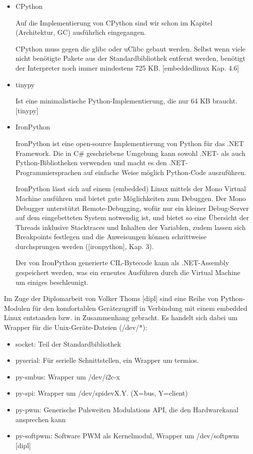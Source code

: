 \begin{itemize}

  \item CPython

        Auf die Implementierung von CPython sind wir schon im Kapitel
        (Architektur, GC) ausführlich eingegangen.

        CPython muss gegen die glibc oder uClibc gebaut werden. Selbst wenn
        viele nicht benötigte Pakete aus der Standardbibliothek entfernt
        werden, benötigt der Interpreter noch immer mindestens 725 KB.
        [embeddedlinux Kap. 4.6]

  \item tinypy

        Ist eine minimalistische Python-Implementierung, die nur 64 KB braucht. [tinypy]
  \item IronPython

        IronPython ist eine open-source Implementierung von Python für das
        .NET Framework. Die in C\# geschriebene Umgebung kann sowohl .NET-
        als auch Python-Bibliotheken verwenden und macht es den
        .NET-Programmiersprachen auf einfache Weise möglich Python-Code
        auszuführen.

        IronPython lässt sich auf einem (embedded) Linux mittels der Mono
        Virtual Machine ausführen und bietet gute Möglichkeiten zum Debuggen.
        Der Mono Debugger unterstützt Remote-Debugging, wofür nur ein kleiner
        Debug-Server auf dem eingebetteten System notwendig ist, und bietet so
        eine Übersicht der Threads inklusive Stacktraces und Inhalten der
        Variablen, zudem lassen sich Breakpoints festlegen und die Anweisungen
        können schrittweise durchsprungen werden ([ironpython], Kap. 3).

        Der von IronPython generierte CIL-Bytecode kann als .NET-Assembly
        gespeichert werden, was ein erneutes Ausführen durch die Virtual
        Machine um einiges beschleunigt.

\end{itemize}


Im Zuge der Diplomarbeit von Volker Thoms [dipl] sind eine Reihe von
Python-Modulen für den komfortablen Gerätezugriff in Verbindung mit einem
embedded Linux entstanden bzw. in Zusammenhang gebracht. Es handelt sich dabei
um Wrapper für die Unix-Geräte-Dateien (/dev/*):


\begin{itemize}

  \item socket: Teil der Standardbibliothek
  \item pyserial: Für serielle Schnittstellen, ein Wrapper um termios.
  \item py-smbus: Wrapper um /dev/i2c-x
  \item py-spi: Wrapper um /dev/spidevX.Y. (X=bus, Y=client)
  \item py-pwm: Generische Pulsweiten Modulations API, die den Hardwarekanal ansprechen kann
  \item py-softpwm: Software PWM als Kernelmodul, Wrapper um /dev/softpwm [dipl]

\end{itemize}


